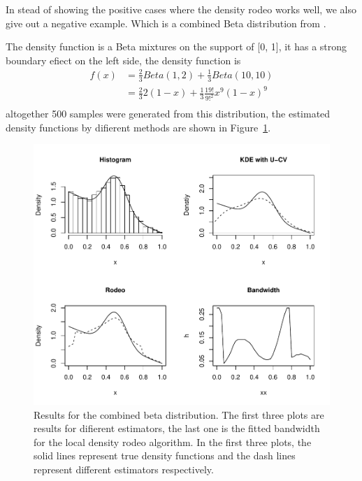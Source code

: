 In stead of showing the positive cases where the density rodeo works well, we also give out a negative example. 
Which is a combined Beta distribution from \cite{loader1996local}.

\begin{example}
    The density function is a Beta mixtures on the support of [0, 1], it has a strong boundary efiect on the left side, the density function is 
    \begin{equation}
        \begin{split}
            f(x) 
            & = \frac{2}{3} Beta(1,2) + \frac{1}{3} Beta(10, 10) \\
            & = \frac{2}{3} 2(1-x) + \frac{1}{3} \frac{19 !}{9 !^{2}} x^{9}(1-x)^{9} \\
        \end{split}
    \end{equation}
    altogether 500 samples were generated from this distribution, the estimated density functions by difierent methods are shown in Figure~\ref{fig: 1d rodeo 4in1 2}. 
\end{example}

\begin{figure}[ht]
    \centering
    \includegraphics[width=\textwidth]{pic/pic3.pdf}
    \caption{Results for the combined beta distribution. The first three plots are results for difierent estimators, the last one is the fitted bandwidth for the local density rodeo algorithm. In the first three plots, the solid lines represent true density functions and the dash lines represent different estimators respectively.}
    \label{fig: 1d rodeo 4in1 2}
\end{figure}

